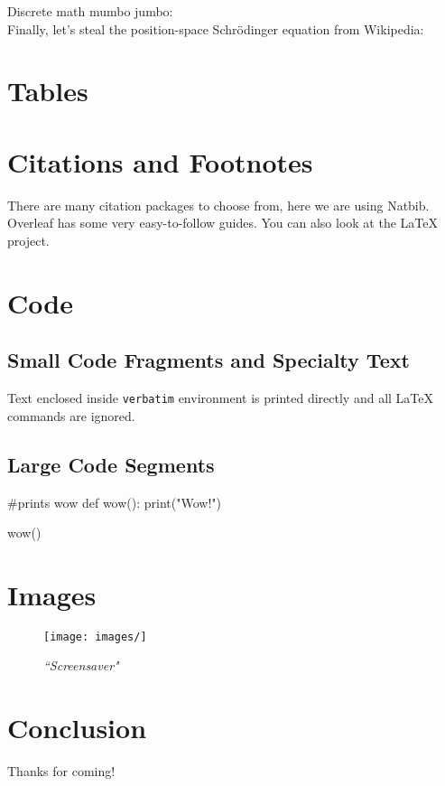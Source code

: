 \documentclass{article}
\begin{document}
Discrete math mumbo jumbo:\\

Finally, let's steal the position-space Schrödinger equation from Wikipedia:
\begin{center}
    
\end{center}

\section{Tables}


\section{Citations and Footnotes}
There are many citation packages to choose from, here we are using Natbib. Overleaf has some very easy-to-follow guides. You can also look at the \LaTeX \hspace{} project. 


\section{Code}
    \subsection{Small Code Fragments and Specialty Text}

    Text enclosed inside \texttt{verbatim} environment 
    is printed directly 
    and all \LaTeX{} commands are ignored.
    
    \subsection{Large Code Segments}

    #prints wow
    def wow():
        print("Wow!")
    
    wow()
    
\section{Images}
\begin{figure}[H]
\centering
\texttt{[image: images/]}
\caption{\textit{``Screensaver"}}
\end{figure}

\section{Conclusion}
Thanks for coming!



\end{document}
